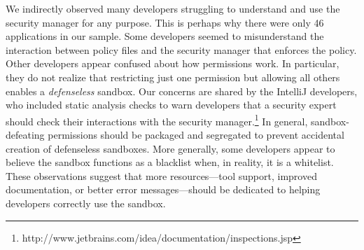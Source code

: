 \documentclass{sig-alternate}
\begin{document}
We indirectly observed many developers struggling to understand and
use the security manager for any purpose. This is perhaps why there
were only 46 applications in our sample. Some developers seemed to
misunderstand the interaction between policy files and the security
manager that enforces the policy. Other developers appear confused
about how permissions work. In particular, they do not realize that
restricting just one permission but allowing all others enables a
\emph{defenseless} sandbox. Our concerns are shared by the IntelliJ developers, who included static analysis checks to warn developers that a security expert should check their interactions with the security manager.\footnote{http://www.jetbrains.com/idea/documentation/inspections.jsp%
} In general, sandbox-defeating permissions
should be packaged and segregated to prevent accidental creation of
defenseless sandboxes. More generally, some developers appear to believe
the sandbox functions as a blacklist when, in reality, it is a whitelist.
These observations suggest that more resources---tool support, improved
documentation, or better error messages---should be dedicated to helping
developers correctly use the sandbox. 



\end{document}
